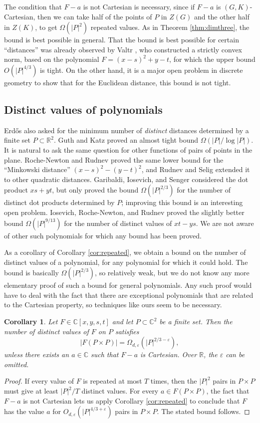 \documentclass{daj}
\newtheorem{corollary}[theorem]{Corollary}
\theoremstyle{definition}
\newcommand{\C}{\mathbb C}
\newcommand{\R}{\mathbb R}
\newcommand{\eps}{\varepsilon}
\begin{document}
The condition that $F-a$ is not Cartesian is necessary,
since if $F-a$ is $(G,K)$-Cartesian, 
then we can take half of the points of $P$ in $Z(G)$ and the other half in $Z(K)$,
to get $\Omega(|P|^2)$ repeated values.
As in Theorem \ref{thm:dimthree}, the bound is best possible in general.
That the bound is best possible for certain ``distances'' was already observed by Valtr \cite{V}, who constructed a strictly convex norm, based on the polynomial $F = (x-s)^2+y-t$, for which the upper bound $O(|P|^{4/3})$ is tight.
On the other hand, it is a major open problem in discrete geometry to show that for the Euclidean distance, this bound is not tight.


\subsection{Distinct values of polynomials}
Erd\H os \cite{Er} also asked for the minimum number of \emph{distinct} distances determined by a finite set $P\subset \R^2$.
Guth and Katz \cite{GK} proved an almost tight bound $\Omega(|P|/\log|P|)$.
It is natural to ask the same question for other functions of pairs of points in the plane.
Roche-Newton and Rudnev \cite{RNR} proved the same lower bound for the ``Minkowski distance'' $(x-s)^2 - (y-t)^2$, and Rudnev and Selig \cite{RS} extended it to other quadratic distances.
Garibaldi, Iosevich, and Senger \cite[Chapter 9]{GIS} considered the dot product $xs+yt$, but only proved the bound $\Omega(|P|^{2/3})$ for the number of distinct dot products determined by $P$; 
improving this bound is an interesting open problem.
Iosevich, Roche-Newton, and Rudnev \cite{IRR} proved the slightly better bound $\Omega(|P|^{9/13})$ for the number of distinct values of $xt-ys$.
We are not aware of other such polynomials for which any bound has been proved.

As a corollary of Corollary \ref{cor:repeated}, we obtain a bound on the number of distinct values of a polynomial, for any polynomial for which it could hold.
The bound is basically $\Omega(|P|^{2/3})$, 
so relatively weak, 
but we do not know any more elementary proof of such a bound for general polynomials.
Any such proof would have to deal with the fact that there are exceptional polynomials that are related to the Cartesian property, so techniques like ours seem to be necessary.

\begin{corollary}\label{cor:distinct}
Let $F\in \C[x,y,s,t]$ and let $P\subset \C^2$ be a finite set.
Then the number of distinct values of $F$ on $P$ satisfies
\[|F(P\times P)| = \Omega_{d,\eps}(|P|^{2/3-\eps}),\]
unless there exists an $a\in \C$ such that $F-a$ is Cartesian. 
Over $\R$, the $\eps$ can be omitted.
\end{corollary}
\begin{proof}
If every value of $F$ is repeated at most $T$ times, then the $|P|^2$ pairs in $P\times P$ must give at least $|P|^2/T$ distinct values.
For every $a\in F(P\times P)$, the fact that $F-a$ is not Cartesian lets us apply Corollary \ref{cor:repeated} to conclude that $F$ has the value $a$ for $O_{d,\eps}(|P|^{4/3+\eps})$ pairs in $P\times P$.
The stated bound follows.
\end{proof}
\end{document}
